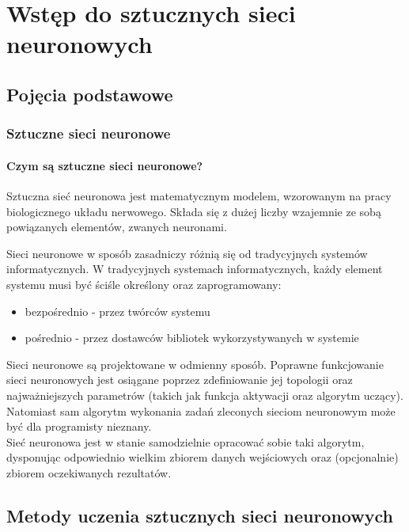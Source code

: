 \chapter{Wstęp do sztucznych sieci neuronowych}
\section{Pojęcia podstawowe}
\subsection{Sztuczne sieci neuronowe}
\subsubsection{Czym są sztuczne sieci neuronowe?}
Sztuczna sieć neuronowa jest matematycznym modelem, wzorowanym na pracy biologicznego układu nerwowego.
Składa się z dużej liczby wzajemnie ze sobą powiązanych elementów,
zwanych neuronami.

Sieci neuronowe w sposób zasadniczy różnią się od tradycyjnych systemów informatycznych. 
W tradycyjnych systemach informatycznych, każdy element systemu musi być ściśle określony oraz zaprogramowany:
\begin{itemize}
\item bezpośrednio - przez twórców systemu
\item pośrednio - przez dostawców bibliotek wykorzystywanych w systemie
\end{itemize}

Sieci neuronowe są projektowane w odmienny sposób.
Poprawne funkcjowanie sieci neuronowych jest osiągane poprzez zdefiniowanie jej topologii oraz najważniejszych parametrów (takich jak funkcja aktywacji oraz algorytm uczący). \\
Natomiast sam algorytm wykonania zadań zleconych sieciom neuronowym może być dla programisty nieznany. \\
Sieć neuronowa jest w stanie samodzielnie opracować sobie taki algorytm, dysponując odpowiednio wielkim zbiorem danych wejściowych oraz (opcjonalnie) zbiorem oczekiwanych rezultatów.

\section{Metody uczenia sztucznych sieci neuronowych}